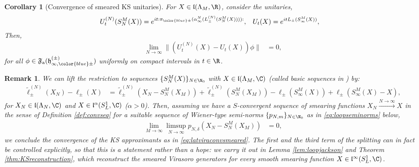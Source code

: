 \documentclass[a4paper, 11pt]{article}
\newcommand{\ua}{\textup a}
\newcommand{\fF}{\mathfrak{F}}\newcommand{\cF}{\mathcal{F}}\newcommand{\dF}{\mathds{F}}\newcommand{\sF}{\mathscr{F}}
\newcommand{\fh}{\mathfrak{h}}
\newcommand{\fl}{\mathfrak{l}}\newcommand{\cl}{\mathcal{l}}
\DeclareMathOperator{\1}{\mathds{1}}
\newtheorem{cor}[thm]{Corollary}
\newtheorem{rem}[thm]{Remark}
\begin{document}
\begin{cor}[Convergence of smeared KS unitaries]
\label{cor:KSconvsmeared}
For $X\in\fl(\Lambda_{M},\R)$, consider the unitaries,
\begin{align*}
U^{(N)}_{t}(S^{M}_{N}(X)) & = e^{it:\pi_{{\color{blue}\pm}}(\alpha^{N}_{\infty}(L^{(N)}_{\pm}(S^{M}_{N}(X)))):}, & U_{t}(X) & = e^{itL_{\pm}(S^{M}_{\infty}(X))},
\end{align*}
Then,
\begin{align*}
\lim_{N\rightarrow\infty}\|(U^{(N)}_{t}(X)-U_{t}(X))\phi\| & = 0,
\end{align*}
for all $\phi\in\fF_{\ua}(\fh^{(\pm)}_{\infty,{\color{blue}\pm}})$ uniformly on compact intervals in $t\in\R$.
\end{cor}
\begin{rem}
\label{rem:KSconvsmeared}
We can lift the restriction to sequences $\{S^{M}_{N}(X)\}_{N\in\N_{0}}$ with $X\in\fl(\Lambda_{M},\C)$ (called basic sequences in \cite{DuffieldMeanFieldDynamical}) by:
\begin{align*}
\tilde{\ell}^{(N)}_{\pm}(X_{N})\!-\!\ell_{\pm}(X) & \!=\!\tilde{\ell}^{(N)}_{\pm}(X_{N}\!-\!S^{M}_{N}(X_{M})\!)\!+\!\tilde{\ell}^{(N)}_{\pm}(S^{M}_{N}(X_{M})\!)\!-\!\ell_{\pm}(S^{M}_{\infty}(X)\!)\!+\!\ell_{\pm}(S^{M}_{\infty}(X)\!-\!X),
\end{align*}
for $X_{N}\in\fl(\Lambda_{N},\C)$ and $X\in\fl^{\alpha}(S^{1}_{L},\C)$ ($\alpha>0$). Then, assuming we have a $S$-convergent sequence of smearing functions $X_{N}\stackrel{N\rightarrow\infty}{\rightarrow} X$ in the sense of Definition \ref{def:convseq} for a suitable sequence of Wiener-type semi-norms $\{p_{N,m}\}_{N\in\N_{0}}$ as in \eqref{eq:loopseminorms} below,
\begin{align*}
\lim_{M\rightarrow\infty}\limsup_{N\rightarrow\infty}p_{N,\delta}(X_{N}-S^{M}_{N}(X_{M})\!) & = 0,
\end{align*}
we conclude the convergence of the KS approximants as in \eqref{eq:latviraconvsmeared}. The first and the third term of the splitting can in fact be controlled explicitly, so that this is a statement rather than a hope: we carry it out in Lemma \ref{lem:loopjackson} and Theorem \ref{thm:KSreconstruction}, which reconstruct the smeared Virasoro generators for every smooth smearing function $X\in\fl^{\infty}(S^{1}_{L},\C)$.
\end{rem}
\end{document}
